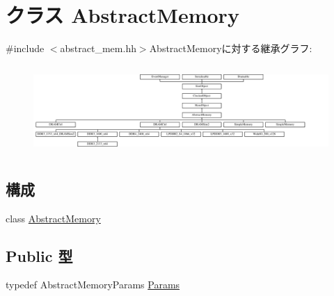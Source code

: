 \hypertarget{classAbstractMemory}{
\section{クラス AbstractMemory}
\label{classAbstractMemory}
}


{\ttfamily \#include $<$abstract\_\-mem.hh$>$}AbstractMemoryに対する継承グラフ:\begin{figure}[H]
\begin{center}
\leavevmode
\includegraphics[height=3.44086cm]{classAbstractMemory}
\end{center}
\end{figure}
\subsection*{構成}
\begin{DoxyCompactItemize}
\item 
class \hyperlink{classAbstractMemory_1_1AbstractMemory}{AbstractMemory}
\end{DoxyCompactItemize}
\subsection*{Public 型}
\begin{DoxyCompactItemize}
\item 
typedef AbstractMemoryParams \hyperlink{classAbstractMemory_ab4fcbcbcfef78d6bc871995f8eca40eb}{Params}
\end{DoxyCompactItemize}
